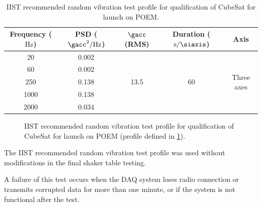 \documentclass[]{report}
\begin{document}
\begin{table}[t]
  \centering
  \begin{tabular}{|c | c | c | c | c|}
    \hline
    \textbf{Frequency ($\si{\hertz}$)} & \textbf{PSD ($\si{\square\gacc\per\hertz}$)} & \textbf{$\si{\gacc}$ (RMS)} & \textbf{Duration ($\si{\second\per\siaxis}$)} & \textbf{Axis}               \\ \hline
    20                                 & 0.002                                        & \multirow{5}{*}{13.5}       & \multirow{5}{*}{60}                           & \multirow{5}{*}{Three axes} \\ \cline{1-2}
    60                                 & 0.002                                        &                             &                                               &                             \\ \cline{1-2}
    250                                & 0.138                                        &                             &                                               &                             \\ \cline{1-2}
    1000                               & 0.138                                        &                             &                                               &                             \\ \cline{1-2}
    2000                               & 0.034                                        &                             &                                               &                             \\ \hline
  \end{tabular}
  \caption{IIST recommended random vibration test profile for qualification of CubeSat for launch on POEM.}
  \label{tabl:random-vibration-profile-iist}
\end{table}


\begin{figure}[H]
  \centering
  
  \caption{IIST recommended random vibration test profile for qualification of CubeSat for launch on POEM (profile defined in \ref{tabl:random-vibration-profile-iist}).}
  \label{fig:random-vibration-qualification-level}
\end{figure}

The IIST recommended random vibration test profile was used without modifications in the final shaker table testing.

A failure of this test occurs when the DAQ system loses radio connection or transmits corrupted data for more than one minute, or if the system is not functional after the test.
\end{document}
